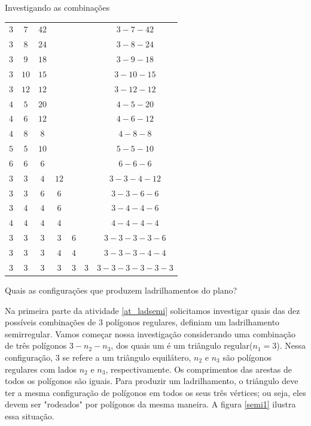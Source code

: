 \begin{task} {Investigando as combinações}
\setlength\tabcolsep{5mm}
\begin{longtabu} to \textwidth{|c|c|c|c|c|c|c|}
\hline\endfirsthead
{} &  &  & &  &  &  \\
\hline
$3$ & $7$ & $42$ & & & & $3-7-42$ \\
\hline
$3$ & $8$ & $24$ & & & & $3-8-24$ \\
\hline
$3$ & $9$ & $18$ & & & & $3-9-18$ \\
\hline
$3$ & $10$ & $15$ & & & & $ 3-10-15$ \\
\hline
$3$ & $12$ & $12$ & & & & $3-12-12$ \\
\hline
$4$ & $5$ & $20$ & & & & $4-5-20$ \\
\hline
$4$ & $6$ & $12$ & & & & $4-6-12$ \\
\hline
$4$ & $8$ & $8$ & & & & $4-8-8$ \\
\hline
$5$ & $5$ & $10$ & & & & $5-5-10$ \\
\hline
$6$ & $6$ & $6$ & & & & $6-6-6$ \\
\hline
$3$ & $3$ & $4$ & $12$ & & & $3-3-4-12$ \\
\hline
$3$ & $3$ & $6$ & $6$ & & & $3-3-6-6$ \\
\hline
$3$ & $4$ & $4$ & $6$ & & & $3-4-4-6$ \\
\hline
$4$ & $4$ & $4$ & $4$ & & & $4-4-4-4$ \\
\hline
$3$ & $3$ & $3$ & $3$ & $6$ & & $3-3-3-3-6$ \\
\hline
$3$ & $3$ & $3$ & $4$ & $4$ & & $3-3-3-4-4$ \\
\hline
$3$ & $3$ & $3$ & $3$ & $3$ & $3$ & $3-3-3-3-3-3$ \\
\hline
\end{longtabu}

Quais as configurações que produzem ladrilhamentos do plano?


\end{task}


Na primeira parte da atividade \ref{at_ladsemi} solicitamos investigar quais das dez possíveis combinações de 3 polígonos regulares, definiam um ladrilhamento semirregular. 
Vamos começar nossa investigação considerando uma combinação de três polígonos $3-n_2-n_3$, dos quais um é um triângulo regular($n_1=3$). 
Nessa configuração, $3$ se refere a um triângulo equilátero, $n_2$ e $n_3$ são polígonos regulares com lados $n_2$ e $n_3$, respectivamente. Os comprimentos das arestas de todos os polígonos são iguais. Para produzir um ladrilhamento, o triângulo deve ter a mesma configuração  de polígonos em todos os seus três vértices; ou seja, eles devem ser "rodeados" por polígonos da mesma maneira. A figura \ref{semi1} ilustra essa situação.  
 
